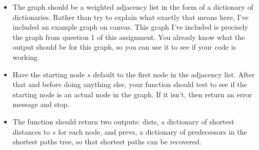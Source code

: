 \documentclass[12pt]{article}
\begin{document}
\begin{enumerate}
\begin{itemize}
\begin{itemize}
            \item The graph should be a weighted adjacency list in the form of a dictionary of dictionaries. Rather than try to explain what exactly that means here, I've included an example graph on canvas. This graph I've included is precisely the graph from question 1 of this assignment. You already know what the output should be for this graph, so you can use it to see if your code is working.
            \item Have the starting node $s$ default to the first node in the adjacency list. After that and before doing anything else, your function should test to see if the starting node is an actual node in the graph. If it isn't, then return an error message and stop.
            \item The function should return two outputs: dists, a dictionary of shortest distances to $s$ for each node, and prevs, a dictionary of predecessors in the shortest paths tree, so that shortest paths can be recovered. 
        \end{itemize} 
    \end{itemize}
\end{enumerate}
\end{document}
